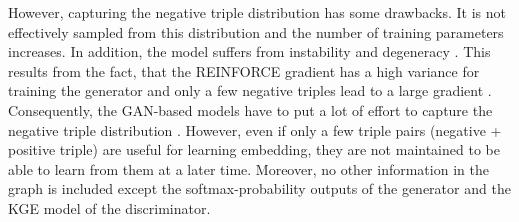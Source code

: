 However, capturing the negative triple distribution has some drawbacks.
It is not effectively sampled from this distribution and the number of training parameters increases.
In addition, the model suffers from instability and degeneracy \cite{zhang2021efficient}.
This results from the fact, that the \textsc{REINFORCE} gradient has a high variance for training the generator and only a few negative triples lead to a large gradient \cite{zhang2021efficient}.
Consequently, the \ac{GAN}-based models have to put a lot of  effort to capture the negative triple distribution \cite{zhang2021efficient}.
However, even if only a few triple pairs (negative + positive triple) are useful for learning embedding, they are not maintained to be able to learn from them at a later time.
Moreover, no other information in the graph is included except the softmax-probability outputs of the generator and the \ac{KGE} model of the discriminator.